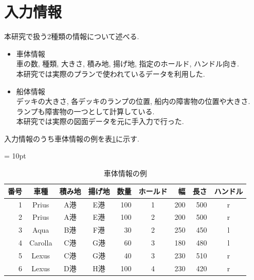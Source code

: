 \section{入力情報}
本研究で扱う2種類の情報について述べる.

\begin{itemize}
    \item 車体情報 \\
    車の数, 種類, 大きさ, 積み地, 揚げ地, 指定のホールド, ハンドル向き. \\
    本研究では実際のプランで使われているデータを利用した.
    \item 船体情報 \\
    デッキの大きさ, 各デッキのランプの位置, 船内の障害物の位置や大きさ. \\
    ランプも障害物の一つとして計算している. \\
    本研究では実際の図面データを元に手入力で行った. \\ 

\end{itemize}
入力情報のうち車体情報の例を表\ref{table21}に示す.

\begin{table}[htbp]
    \tabcolsep = 10pt
    \renewcommand{\arraystretch}{0.7}
    \caption{車体情報の例}
    \label{table21}
    \begin{center}
    \begin{tabular}{rcccrcrrc} 
        \hline
    番号 & 車種 & 積み地 & 揚げ地 & 数量 & ホールド & 幅 & 長さ & ハンドル\\ 
    \hline
    1 & Prius & A港 & E港 & 100 & 1 & 200 & 500 & r \\
    2 & Prius & A港 & E港 & 100 & 2 & 200 & 500 & r \\
    3 & Aqua & B港 & F港 & 30 & 2 & 250 & 450 & l \\
    4 & Carolla & C港 & G港 & 60 & 3 & 180 & 480 & l \\
    5 & Lexus & C港 & G港 & 40 & 3 & 230 & 510 & r \\
    6 & Lexus & D港 & H港 & 100 & 4 & 230 & 420 & r \\
    \hline
    \end{tabular}
    \end{center}
    \end{table}



